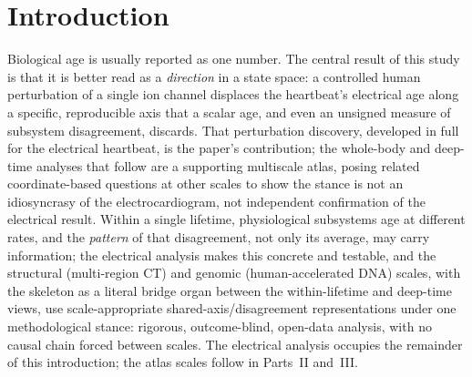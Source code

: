 \documentclass[11pt]{article}
\begin{document}
\begin{abstract}
($r=\num{0.26}$). At brain scale, four modality-specific AABC clocks recovered
chronological age on held-out data ($r=\numrange{0.50}{0.59}$), but the
prespecified brain-disagreement score showed no detectable association with
subsequent four-metre walk-performance change ($\beta_D=-\num{0.021}$ per SD, 95\% CI
$[-\num{0.051},+\num{0.009}]$, $p=\num{0.17}$; $n=\num{295}$). In a distinct
open-data T1 analysis, older LEMON participants showed greater cross-view
structural-aging dispersion than younger participants (Cohen's $d=\num{0.84}$);
the contrast remained positive in all \num{5000} balanced-group resamples
(median $d=\num{0.60}$). At anatomical scale, a volume-only multi-region CT
model ($n=\num{1227}$) achieved a cross-validated MAE of \num{8.56} years,
with cardiovascular volumes providing the strongest system-level age estimate
and exploratory structure-level residuals producing an anatomically patterned
hypothesis map. These cross-scale analyses separate constructability,
localization and outcome utility rather than independently confirming the
electrical perturbation result. A separate exploratory evolutionary-genomics
screen scored \num{1955} substitutions from the \num{312}-element Zoonomia HAR catalogue and found
no matched enrichment near skeletal GWAS loci ($p=\num{0.24}$), yielding hypotheses rather than
validated regulatory findings. Phase-resolved biological-age representations
can therefore be interrogated as coordinates in a state space rather than
compressed to one scalar.
\end{abstract}

\section{Introduction}

Biological age is usually reported as one number. The central result of this study is that it is
better read as a \emph{direction} in a state space: a controlled human perturbation of a single
ion channel displaces the heartbeat's electrical age along a specific, reproducible axis that a
scalar age, and even an unsigned measure of subsystem disagreement, discards. That perturbation
discovery, developed in full for the electrical heartbeat, is the paper's contribution; the
whole-body and deep-time analyses that follow are a supporting multiscale atlas, posing related
coordinate-based questions at other scales to show the stance is not an idiosyncrasy of the
electrocardiogram, not independent confirmation of the electrical result. Within a single lifetime,
physiological subsystems age at different rates, and the \emph{pattern} of that disagreement, not
only its average, may carry information; the electrical analysis makes this concrete and testable,
and the structural (multi-region CT) and genomic (human-accelerated DNA) scales, with the skeleton as
a literal bridge organ between the within-lifetime and deep-time views, use scale-appropriate
shared-axis/disagreement representations under one methodological stance: rigorous, outcome-blind,
open-data analysis, with no causal chain forced between scales. The electrical analysis occupies
the remainder of this introduction; the atlas scales follow in Parts~II and~III.
\end{document}

